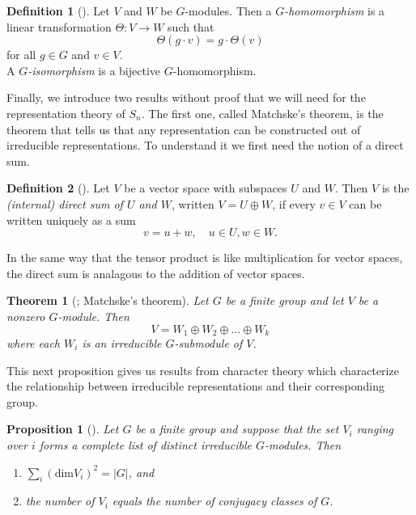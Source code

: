 \documentclass[12pt,twoside]{reedthesis}
\theoremstyle{plain}   %
\newtheorem{thm}{Theorem}[section] %
\newtheorem{prop}{Proposition}[section]
\theoremstyle{definition}
\newtheorem{defn}{Definition}[section]
\theoremstyle{remark}
\numberwithin{equation}{section}
\def\dim{\mathrm{dim}}
\begin{document}
  \begin{defn}[{\cite[Definition 1.6.1]{sagan}}]
    Let $V$ and $W$ be $G$-modules. Then a \emph{$G$-homomorphism} is a linear transformation $\Theta: V \to W$ such that
    \[\Theta(g \cdot v) = g \cdot \Theta(v)\]
    for all $g \in G$ and $v \in V$.\\
    A \emph{$G$-isomorphism} is a bijective $G$-homomorphism.
  \end{defn}

  Finally, we introduce two results without proof that we will need for the representation theory of $S_n$. The first one, called
  Matchske's theorem, is the theorem that tells us that any representation can be constructed out of irreducible representations.
  To understand it we first need the notion of a direct sum.
  \begin{defn}[{\cite[Definition 1.5.1]{sagan}}]
    Let $V$ be a vector space with subspaces $U$ and $W$.
    Then $V$ is the \emph{(internal) direct sum of $U$ and $W$}, written $V = U \oplus W$, if every $v \in V$ can be
    written uniquely as a sum
    \[v= u +w, \quad u \in U, w \in W.\]
  \end{defn}
  In the same way that the tensor product is like multiplication for vector spaces, the direct sum is analagous to the addition of vector spaces.
  \begin{thm}[{\cite[Theorem 1.5.3]{sagan}; Matchske's theorem}]
    Let $G$ be a finite group and let $V$ be a nonzero $G$-module. Then
    \[ V = W_1 \oplus W_2 \oplus \dots \oplus W_k\]
    where each $W_i$ is an irreducible $G$-submodule of $V$.
  \end{thm}

  This next proposition gives us results from character theory which characterize the relationship between irreducible representations
  and their corresponding group.

  \begin{prop}[{\cite[Proposition 1.10.1]{sagan}}]
    Let $G$ be a finite group and suppose that the set $V_i$ ranging over $i$ forms a complete list of
    distinct irreducible $G$-modules. Then
    \begin{enumerate}
    \item $\sum_i (\dim V_i)^2 = |G|$, and
    \item the number of $V_i$ equals the number of conjugacy classes of $G$.
    \end{enumerate}
  \end{prop}   
\end{document}
